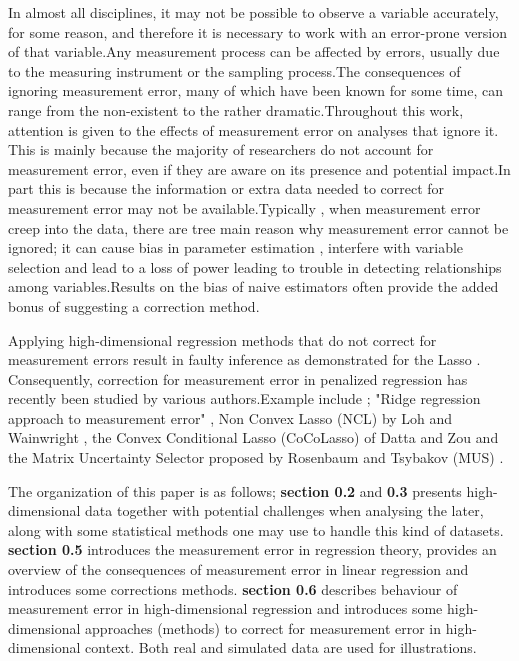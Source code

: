 \documentclass[12pt]{report}
\begin{document}
In almost all disciplines, it may not be possible to observe a variable accurately, for some reason, and therefore it is necessary to work with an error-prone version of that variable.Any measurement process can be affected by errors, usually due to the measuring instrument or the sampling process.The consequences of ignoring measurement error, many of which have been known for some time, can range from the non-existent to the rather dramatic.Throughout this work, attention is given to the effects of measurement error on analyses that ignore it. This is mainly because the majority of researchers do not account for measurement error, even if they are aware on its presence  and potential impact.In part this is because the information or extra data needed to correct for measurement error may not be available.Typically , when measurement error creep into the data, there are tree main reason why measurement error cannot be ignored; it can cause bias in parameter estimation \cite{nref1}, interfere with variable selection \cite{nref17} and lead to a loss of power \cite{nref11} leading to trouble in detecting relationships among variables.Results on the bias of naive estimators often provide the added bonus of suggesting a correction method.

Applying high-dimensional regression methods that do not correct for measurement errors result in faulty inference as demonstrated for the Lasso \cite{nref6}. Consequently, correction for measurement error in penalized regression has recently been studied by various authors.Example include ; "Ridge regression approach to measurement error"\cite{nref6} , Non Convex Lasso (NCL) by Loh and Wainwright \cite{nref17}, the Convex Conditional Lasso (CoCoLasso) of Datta and Zou \cite{nref18} and the Matrix Uncertainty Selector proposed by Rosenbaum and Tsybakov (MUS) \cite{nref23}.

The organization of this paper is as follows; \textbf{section 0.2} and \textbf{0.3} presents high-dimensional data together with potential challenges when analysing the later, along with some statistical methods one may use to handle this kind of datasets. \textbf{section 0.5} introduces the measurement error in regression theory, provides an overview of the consequences of measurement error in linear regression and introduces some corrections methods. \textbf{section 0.6} describes behaviour of measurement error in high-dimensional regression and introduces some high-dimensional approaches (methods) to correct for measurement error in high-dimensional context. Both real and simulated data are used for illustrations.
\end{document}
